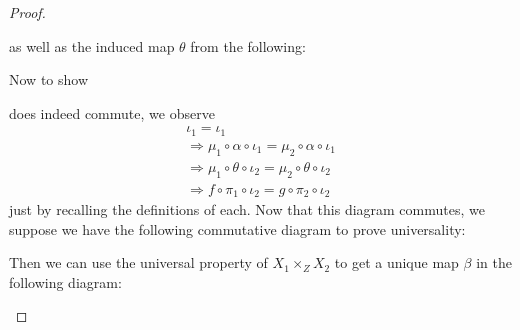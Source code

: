 \documentclass{article}
\begin{document}
\begin{proof}
\begin{center}
\begin{tikzcd}
    \end{tikzcd}
\end{center}
    as well as the induced map $\theta$ from the following:
    \begin{center}
\end{center}
Now to show
    \begin{center}
    \end{center}
    does indeed commute, we observe
    \begin{align*}
        \iota_1=\iota_1\\
        \Rightarrow \mu_1\circ \alpha\circ \iota_1=\mu_2\circ \alpha\circ \iota_1\\
        \Rightarrow \mu_1\circ \theta\circ \iota_2=\mu_2\circ \theta\circ \iota_2\\
        \Rightarrow f\circ \pi_1\circ \iota_2=g\circ \pi_2\circ \iota_2
    \end{align*}
    just by recalling the definitions of each. Now that this diagram commutes, we suppose we have the following commutative diagram to prove universality:
    \begin{center}
    \end{center}
    Then we can use the universal property of $X_1\times_Z X_2$ to get a unique map $\beta$ in the following diagram:
    \begin{center}
    \begin{tikzcd}

\end{tikzcd}
\end{center}
\end{proof}
\end{document}
